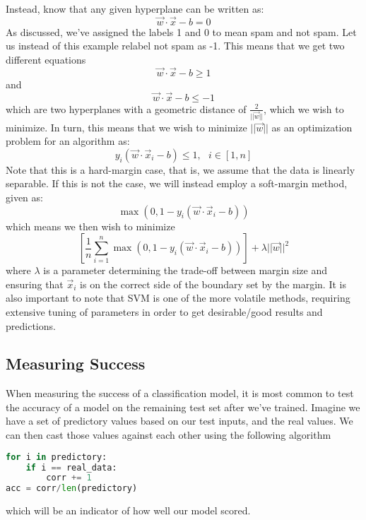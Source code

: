 \documentclass{article}
\begin{document}
\newline
Instead, know that any given hyperplane can be written as:
\begin{equation*}
    \Vec{w}\cdot \Vec{x} - b = 0
\end{equation*}
As discussed, we've assigned the labels 1 and 0 to mean spam and not spam. Let us instead of this example relabel not spam as -1. \newpage
This means that we get two different equations
\begin{equation*}
    \Vec{w}\cdot \Vec{x} - b \geq 1
\end{equation*}
and
\begin{equation*}
    \Vec{w}\cdot \Vec{x} - b \leq -1
\end{equation*}
which are two hyperplanes with a geometric distance of $\frac{2}{||\Vec{w}||}$, which we wish to minimize.
\newline
In turn, this means that we wish to minimize $||\Vec{w}||$ as an optimization problem for an algorithm as:
\begin{equation*}
    y_i(\Vec{w}\cdot \Vec{x}_i -b) \leq 1, \ \ \  i \in [1, n]
\end{equation*}
Note that this is a hard-margin case, that is, we assume that the data is linearly separable. If this is not the case, we will instead employ a soft-margin method, given as:
\begin{equation*}
    \max(0,1 - y_i(\Vec{w}\cdot \Vec{x}_i - b))
\end{equation*}
which means we then wish to minimize
\begin{equation*}
    \left[ \frac{1}{n} \sum_{i=1}^n \max(0, 1 - y_i(\Vec{w}\cdot \Vec{x}_i - b)) \right] + \lambda ||\Vec{w}||^2
\end{equation*}
where $\lambda$ is a parameter determining the trade-off between margin size and ensuring that $\Vec{x}_i$ is on the correct side of the boundary set by the margin.
\newline
It is also important to note that SVM is one of the more volatile methods, requiring extensive tuning of parameters in order to get desirable/good results and predictions.
\subsection{Measuring Success}
When measuring the success of a classification model, it is most common to test the accuracy of a model on the remaining test set after we've trained. 
\newline
Imagine we have a set of predictory values based on our test inputs, and the real values. We can then cast those values against each other using the following algorithm
\begin{lstlisting}[language=python]
for i in predictory:
    if i == real_data:
        corr += 1
acc = corr/len(predictory)

\end{lstlisting}
which will be an indicator of how well our model scored.
\newpage
\end{document}
